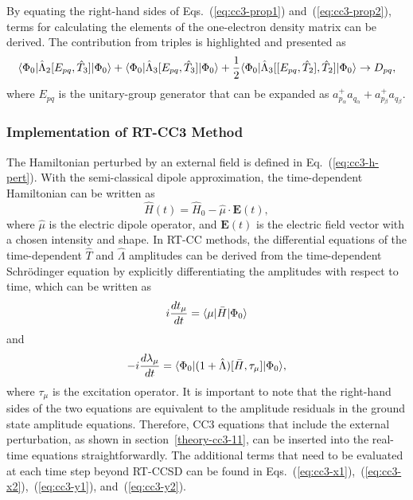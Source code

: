 By equating the right-hand sides of Eqs.~(\ref{eq:cc3-prop1}) and~(\ref{eq:cc3-prop2}), terms for calculating the elements of the one-electron density matrix can be derived. The contribution from triples is highlighted and presented as
\begin{equation}
\langle\Phi_{0} |\hat{\Lambda}_{2}[E_{pq}, \hat{T}_{3}]| \Phi_{0} \rangle + \langle\Phi_{0} |\hat{\Lambda}_{3}[E_{pq}, \hat{T}_{3}]| \Phi_{0} \rangle 
+ \frac{1}{2}\langle\Phi_{0} |\hat{\Lambda}_{3}[[E_{pq}, \hat{T}_{2}], \hat{T}_{2}]| \Phi_{0} \rangle \rightarrow D_{pq},
\label{eq:cc3-opdm}
\end{equation}
where $E_{pq}$ is the unitary-group generator that can be expanded as $a_{p_{\alpha}}^{+}a_{q_{\alpha}} + a_{p_{\beta}}^{+}a_{q_{\beta}}$.

\subsubsection{Implementation of RT-CC3 Method}  \label{theory-cc3-12}
The Hamiltonian perturbed by an external field is defined in Eq.~(\ref{eq:cc3-h-pert}). With the semi-classical dipole approximation, the time-dependent Hamiltonian can be written as
\begin{equation}
\hat{H}(t)= \hat{H}_{0} - \hat{\mu} \cdot \textbf{E}(t),
\label{eq:cc3-H-efield}
\end{equation}
where $\hat{\mu}$ is the electric dipole operator, and $\textbf{E}(t)$ is the electric field vector with a chosen intensity and shape. In RT-CC methods, the differential equations of the time-dependent $\hat{T}$ and $\hat{\Lambda}$ amplitudes can be derived from the time-dependent Schr\"odinger equation by explicitly differentiating the amplitudes with respect to time, which can be written as
\begin{equation}
i\frac{dt_{\mu}}{dt} = \langle\mu |\bar{H}| \Phi_{0} \rangle
\label{eq:cc3-rt-t}
\end{equation}
and
\begin{equation}
-i\frac{d\lambda_{\mu}}{dt} = \langle\Phi_{0} |(1+\hat{\Lambda})[\bar{H}, \tau_{\mu}]| \Phi_{0} \rangle,
\label{eq:cc3-rt-l}
\end{equation}
where $\tau_{\mu}$ is the excitation operator. It is important to note that the right-hand sides of the two equations are equivalent to the amplitude residuals in the ground state amplitude equations. Therefore, CC3 equations that include the external perturbation, as shown in section~\ref{theory-cc3-11}, can be inserted into the real-time equations straightforwardly. The additional terms that need to be evaluated at each time step beyond RT-CCSD can be found in Eqs.~(\ref{eq:cc3-x1}),~(\ref{eq:cc3-x2}),~(\ref{eq:cc3-y1}), and~(\ref{eq:cc3-y2}).   

